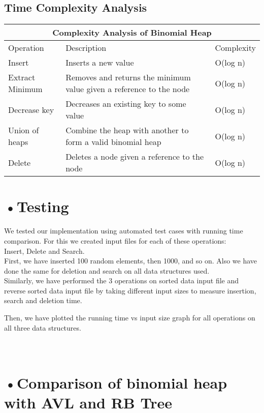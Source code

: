 \subsection*{Time Complexity Analysis}

\begin{tabular}{ |p{3cm}||p{6cm}||p{3cm}|  }
 \hline
 \multicolumn{3}{|c|}{Complexity Analysis of Binomial Heap} \\
 \hline
  Operation& Description & Complexity\\
 \hline
Insert & Inserts a new value  & O(log n)\\
Extract Minimum& Removes and returns the minimum value given a reference to the node & O(log n)   \\
Decrease key& Decreases an existing key to some value  &O(log n)\\
Union of heaps & Combine the heap with another to form a valid binomial heap  &O(log n)\\
Delete & Deletes a node given a reference to the node & O(log n)\\
 \hline
\end{tabular}


	\section*{•Testing} 
	
	We tested our implementation using automated test cases with running time comparison.
	For this we created input files for each of these operations:\\
	Insert, Delete and Search. \\ 

First, we have inserted 100 random elements, then 1000, and so on. 
Also we have done the same for deletion and search on all data structures used.\\

Similarly, we have performed the 3 operations on sorted data input file and reverse sorted data input file by taking different input sizes to measure insertion, search and deletion time. 
		
	Then, we have plotted the running time vs input size graph for all operations on all three data structures.\\


\section*{\\•Comparison of binomial heap with AVL and RB Tree}

